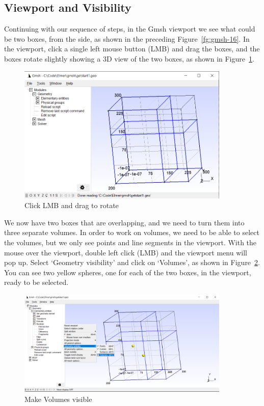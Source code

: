 \subsection{Viewport and Visibility}

Continuing with our sequence of steps, in the Gmsh viewport we see what could be two boxes, from the side, as shown in the preceding Figure~\ref{fg:gmsh-16}.  In the viewport, click a single left mouse button (LMB) and drag the boxes, and the boxes rotate slightly showing a 3D view of the two boxes, as shown in Figure~\ref{fg:gmsh-17}.

\begin{figure}[H]
\centering
\includegraphics[width=0.9\textwidth]{gmsh-17}
\caption{Click LMB and drag to rotate}\label{fg:gmsh-17}
\end{figure}

We now have two boxes that are overlapping, and we need to turn them into three separate volumes.  In order to work on volumes, we need to be able to select the volumes, but we only see points and line segments in the viewport.  With the mouse over the viewport, double left click (LMB) and the viewport menu will pop up.  Select `Geometry visibility' and click on `Volumes', as shown in Figure~\ref{fg:gmsh-18}.  You can see two yellow spheres, one for each of the two boxes, in the viewport, ready to be selected.

\begin{figure}[H]
\centering
\includegraphics[width=0.9\textwidth]{gmsh-18}
\caption{Make Volumes visible}\label{fg:gmsh-18}
\end{figure}

